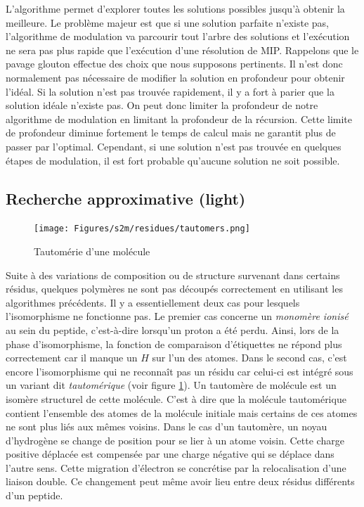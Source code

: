 L'algorithme permet d'explorer toutes les solutions possibles jusqu'à obtenir la meilleure.
Le problème majeur est que si une solution parfaite n'existe pas, l'algorithme de modulation va parcourir tout l'arbre des solutions et l'exécution ne sera pas plus rapide que l'exécution d'une résolution de MIP.
Rappelons que le pavage glouton effectue des choix que nous supposons pertinents.
Il n'est donc normalement pas nécessaire de modifier la solution en profondeur pour obtenir l'idéal.
Si la solution n'est pas trouvée rapidement, il y a fort à parier que la solution idéale n'existe pas.
On peut donc limiter la profondeur de notre algorithme de modulation en limitant la profondeur de la récursion.
Cette limite de profondeur diminue fortement le temps de calcul mais ne garantit plus de passer par l'optimal.
Cependant, si une solution n'est pas trouvée en quelques étapes de modulation, il est fort probable qu'aucune solution ne soit possible.


\subsection{Recherche approximative (light)}

\label{light_p}

\begin{figure}[!ht]
  \begin{center}
    \texttt{[image: Figures/s2m/residues/tautomers.png]}
    \caption{\label{tautomer}Tautomérie d'une molécule}
  \end{center}
\end{figure}

Suite à des variations de composition ou de structure survenant dans certains résidus, quelques polymères ne sont pas découpés correctement en utilisant les algorithmes précédents.
Il y a essentiellement deux cas pour lesquels l'isomorphisme ne fonctionne pas.
Le premier cas concerne un \textit{monomère ionisé} au sein du peptide, c'est-à-dire lorsqu'un proton a été perdu.
Ainsi, lors de la phase d'isomorphisme, la fonction de comparaison d'étiquettes ne répond plus correctement car il manque un $H$ sur l'un des atomes.
Dans le second cas, c'est encore l'isomorphisme qui ne reconnaît pas un résidu car celui-ci est intégré sous un variant dit {\em tautomérique} (voir figure \ref{tautomer}).
Un tautomère de molécule est un isomère structurel de cette molécule.
C'est à dire que la molécule tautomérique contient l'ensemble des atomes de la molécule initiale  mais certains de ces atomes ne sont plus liés aux mêmes voisins.
Dans le cas d'un tautomère, un noyau d'hydrogène se change de position pour se lier à un atome voisin.
Cette charge positive déplacée est compensée par une charge négative qui se déplace dans l'autre sens.
Cette migration d'électron se concrétise par la relocalisation d'une liaison double.
Ce changement peut même avoir lieu entre deux résidus différents d'un peptide.

